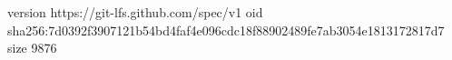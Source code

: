 version https://git-lfs.github.com/spec/v1
oid sha256:7d0392f3907121b54bd4faf4e096cdc18f88902489fe7ab3054e1813172817d7
size 9876
